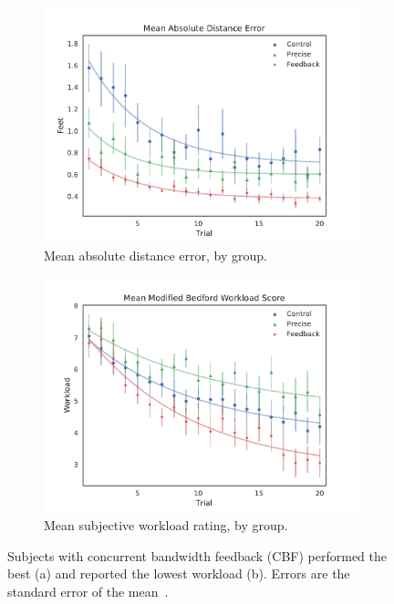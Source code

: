 \begin{figure}[tb!]
    \begin{center}
        \begin{subfigure}{0.49\textwidth}
            \includegraphics[width=\linewidth]{plots/Group_absDistErr_clean_fit_30.png}
            \caption{Mean absolute distance error, by group.}
            \label{figure:saferdistance}
        \end{subfigure}\hfill
        \begin{subfigure}{0.49\textwidth}
            \includegraphics[width=\linewidth]{plots/Group_Workload_fit_30.png}
            \caption{Mean subjective workload rating, by group.}
            \label{figure:saferworkload}
        \end{subfigure}
        \caption{Subjects with concurrent bandwidth feedback (CBF) performed the best (a) and reported the lowest workload (b). Errors are the standard error of the mean~\citep{karasinski_real-time_2016}.}
    \end{center}
\end{figure}

